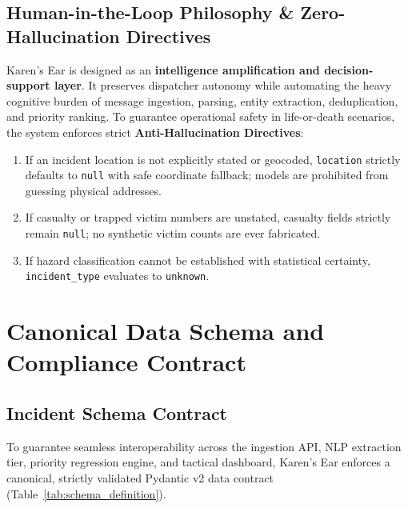 \documentclass[10pt,a4paper]{article}
\begin{document}
\subsection{Human-in-the-Loop Philosophy \& Zero-Hallucination Directives}
Karen's Ear is designed as an \textbf{intelligence amplification and decision-support layer}. It preserves dispatcher autonomy while automating the heavy cognitive burden of message ingestion, parsing, entity extraction, deduplication, and priority ranking.
To guarantee operational safety in life-or-death scenarios, the system enforces strict \textbf{Anti-Hallucination Directives}:
\begin{enumerate}
  \item If an incident location is not explicitly stated or geocoded, \texttt{location} strictly defaults to \texttt{null} with safe coordinate fallback; models are prohibited from guessing physical addresses.
  \item If casualty or trapped victim numbers are unstated, casualty fields strictly remain \texttt{null}; no synthetic victim counts are ever fabricated.
  \item If hazard classification cannot be established with statistical certainty, \texttt{incident\_type} evaluates to \texttt{unknown}.
\end{enumerate}


\section{Canonical Data Schema and Compliance Contract}
\subsection{Incident Schema Contract}
To guarantee seamless interoperability across the ingestion API, NLP extraction tier, priority regression engine, and tactical dashboard, Karen's Ear enforces a canonical, strictly validated Pydantic v2 data contract (Table~\ref{tab:schema_definition}).
\end{document}
